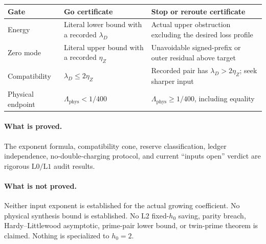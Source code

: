 \documentclass[11pt,a4paper]{article}
\theoremstyle{definition}
\theoremstyle{remark}
\newcommand{\Lzero}{\mathrm{L0}}
\newcommand{\Lone}{\mathrm{L1}}
\newcommand{\Ltwo}{\mathrm{L2}}
\newcommand{\Lam}{\Lambda_{\mathrm{phys}}}
\begin{document}
\begin{center}
\small
\begin{tabularx}{\textwidth}{@{}p{}p{}X@{}}
\toprule
Gate & Go certificate & Stop or reroute certificate\\
\midrule
Energy
& Literal lower bound with a recorded \(\lambda_D\)
& Actual upper obstruction excluding the desired loss profile\\
Zero mode
& Literal upper bound with a recorded \(\eta_Z\)
& Unavoidable signed-prefix or outer residual above target\\
Compatibility
& \(\lambda_D\le2\eta_Z\)
& Recorded pair has \(\lambda_D>2\eta_Z\); seek sharper input\\
Physical endpoint
& \(\Lam<1/400\)
& \(\Lam\ge1/400\), including equality\\
\bottomrule
\end{tabularx}
\end{center}

\paragraph{What is proved.}
The exponent formula, compatibility cone, reserve classification,
ledger independence, no-double-charging protocol, and current
``inputs open'' verdict are rigorous \(\Lzero/\Lone\) audit results.

\paragraph{What is not proved.}
Neither input exponent is established for the actual growing
coefficient.  No physical synthesis bound is established.  No
\(\Ltwo\) fixed-\(h_0\) saving, parity breach, Hardy--Littlewood
asymptotic, prime-pair lower bound, or twin-prime theorem is claimed.
Nothing is specialized to \(h_0=2\).

\begingroup
\small
\setlength{\bibsep}{2pt plus 0.3ex}
\sloppy


\endgroup
\end{document}
